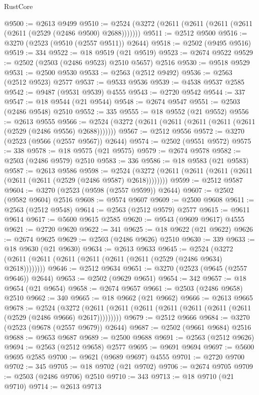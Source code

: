 \begin{lexlean}{RustCore}
\begin{coremodule}
@9500 := @2613 @9499
@9510 := @2524 (@3272 (@2611 (@2611 (@2611 (@2611 (@2611 (@2529 (@2486 @9500) @2688)))))))
@9511 := @2512 @9500
@9516 := @3270 (@2523 (@9510 (@2557 @9511)) @2644)
@9518 := @2502 (@9495 @9516)
@9519 := 334
@9522 := @18 @9519 (@21 @9519)
@9523 := @2674 @9522
@9529 := @2502 (@2503 (@2486 @9523) @2510 @5657) @2516
@9530 := @9518 @9529
@9531 := @2500 @9530
@9533 := @2563 (@2512 @9492)
@9536 := @2563 (@2512 @9523) @2577
@9537 := @9533 @9536
@9539 := @4538 @9537 @2585
@9542 := @9487 (@9531 @9539) @4555
@9543 := @2720 @9542
@9544 := 337
@9547 := @18 @9544 (@21 @9544)
@9548 := @2674 @9547
@9551 := @2503 (@2486 @9548) @2510
@9552 := 335
@9555 := @18 @9552 (@21 @9552)
@9556 := @2613 @9555
@9566 := @2524 (@3272 (@2611 (@2611 (@2611 (@2611 (@2611 (@2529 (@2486 @9556) @2688)))))))
@9567 := @2512 @9556
@9572 := @3270 (@2523 (@9566 (@2557 @9567)) @2644)
@9574 := @2502 (@9551 @9572)
@9575 := 338
@9578 := @18 @9575 (@21 @9575)
@9579 := @2674 @9578
@9582 := @2503 (@2486 @9579) @2510
@9583 := 336
@9586 := @18 @9583 (@21 @9583)
@9587 := @2613 @9586
@9598 := @2524 (@3272 (@2611 (@2611 (@2611 (@2611 (@2611 (@2611 (@2529 (@2486 @9587) @2618))))))))
@9599 := @2512 @9587
@9604 := @3270 (@2523 (@9598 (@2557 @9599)) @2644)
@9607 := @2502 (@9582 @9604) @2516
@9608 := @9574 @9607
@9609 := @2500 @9608
@9611 := @2563 (@2512 @9548)
@9614 := @2563 (@2512 @9579) @2577
@9615 := @9611 @9614
@9617 := @5600 @9615 @2585
@9620 := @9543 (@9609 @9617) @4555
@9621 := @2720 @9620
@9622 := 341
@9625 := @18 @9622 (@21 @9622)
@9626 := @2674 @9625
@9629 := @2503 (@2486 @9626) @2510
@9630 := 339
@9633 := @18 @9630 (@21 @9630)
@9634 := @2613 @9633
@9645 := @2524 (@3272 (@2611 (@2611 (@2611 (@2611 (@2611 (@2611 (@2529 (@2486 @9634) @2618))))))))
@9646 := @2512 @9634
@9651 := @3270 (@2523 (@9645 (@2557 @9646)) @2644)
@9653 := @2502 (@9629 @9651)
@9654 := 342
@9657 := @18 @9654 (@21 @9654)
@9658 := @2674 @9657
@9661 := @2503 (@2486 @9658) @2510
@9662 := 340
@9665 := @18 @9662 (@21 @9662)
@9666 := @2613 @9665
@9678 := @2524
    (@3272 (@2611 (@2611 (@2611 (@2611 (@2611 (@2611 (@2611 (@2529 (@2486 @9666) @2617)))))))))
@9679 := @2512 @9666
@9684 := @3270 (@2523 (@9678 (@2557 @9679)) @2644)
@9687 := @2502 (@9661 @9684) @2516
@9688 := @9653 @9687
@9689 := @2500 @9688
@9691 := @2563 (@2512 @9626)
@9694 := @2563 (@2512 @9658) @2577
@9695 := @9691 @9694
@9697 := @5600 @9695 @2585
@9700 := @9621 (@9689 @9697) @4555
@9701 := @2720 @9700
@9702 := 345
@9705 := @18 @9702 (@21 @9702)
@9706 := @2674 @9705
@9709 := @2503 (@2486 @9706) @2510
@9710 := 343
@9713 := @18 @9710 (@21 @9710)
@9714 := @2613 @9713

\end{coremodule}
\end{lexlean}
